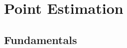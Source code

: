 \documentclass[../main]{subfiles}
\begin{document}
\chapter{Point Estimation}
\section{Fundamentals}
\end{document}
